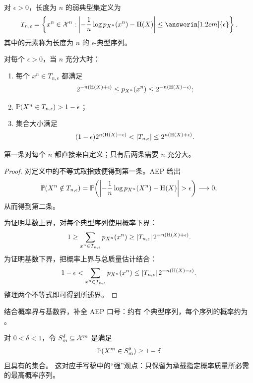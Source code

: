 
\begin{definition}[弱典型集]\label{def:weak-typical-set}
对 $\epsilon>0$，长度为 $n$ 的弱典型集定义为
\[
  T_{n,\epsilon}
  =\left\{x^n\in\X^n:
  \left|-\frac1n\log p_{X^n}(x^n)-\Ent(X)\right|
  \le \answerin[1.2cm]{\epsilon}\right\}.
\]
其中的元素称为长度为 $n$ 的 $\epsilon$-典型序列。
\end{definition}

\begin{theorem}[典型集的性质]\label{thm:typical-set-properties}
对每个 $\epsilon>0$，当 $n$ 充分大时：
\begin{enumerate}
  \item 每个 $x^n\in T_{n,\epsilon}$ 都满足
  \[
    2^{-n(\mathrm{H}(X)+\epsilon)}
    \le p_{X^n}(x^n)
    \le 2^{-n(\mathrm{H}(X)-\epsilon)};
  \]
  \item $\mathbb{P}(X^n\in T_{n,\epsilon})>1-\epsilon$；
  \item 集合大小满足
  \[
    (1-\epsilon)2^{n(\Ent(X)-\epsilon)}
    <|T_{n,\epsilon}|
    \le2^{n(\Ent(X)+\epsilon)}.
  \]
\end{enumerate}
第一条对每个 $n$ 都直接来自定义；只有后两条需要 $n$ 充分大。
\end{theorem}

\begin{proof}
对定义中的不等式取指数便得到第一条。AEP 给出
\[
  \PP(X^n\notin T_{n,\epsilon})
  =\PP\!\left(\left|-\frac1n\log p_{X^n}(X^n)-\Ent(X)\right|>\epsilon\right)
  \longrightarrow0,
\]
从而得到第二条。

为证明基数上界，对每个典型序列使用概率下界：
\[
  1\ge\sum_{x^n\in T_{n,\epsilon}}p_{X^n}(x^n)
  \ge |T_{n,\epsilon}|\,2^{-n(\mathrm{H}(X)+\epsilon)}.
\]
为证明基数下界，把概率上界与总质量估计结合：
\[
  1-\epsilon
  <\sum_{x^n\in T_{n,\epsilon}}p_{X^n}(x^n)
  \le |T_{n,\epsilon}|\,2^{-n(\mathrm{H}(X)-\epsilon)}.
\]
整理两个不等式即可得到所述界。
\end{proof}

\begin{yourturn}
结合概率界与基数界，补全 AEP 口号：约有
 个典型序列，每个序列的概率约为
。
\end{yourturn}


\begin{definition}[最小高概率集合]\label{def:minimum-high-probability-set}
对 $0<\delta<1$，令 $S_m^\delta\subseteq\mathcal{X}^m$ 是满足
\[
  \mathbb{P}(X^m\in S_m^\delta)\ge1-\delta
\]
且具有的集合。
这对应手写稿中的“强”观点：只保留为承载指定概率质量所必需的最高概率序列。
\end{definition}

